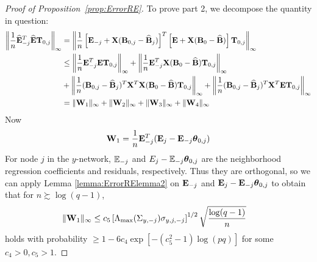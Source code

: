 \documentclass[12pt, letterpaper]{article}
\numberwithin{equation}{section}
\begin{document}
\begin{proof}[Proof of Proposition~\ref{prop:ErrorRE}]
To prove part 2, we decompose the quantity in question:
%
\begin{align}\label{eqn:ErrorRElemma2maineqn}
\left\| \frac{1}{n} \widehat {{\mathbf{E}}}_{-j}^T \widehat {{\mathbf{E}}} {\mathbf{T}}_{0,j} \right\|_\infty &=
\left\| \frac{1}{n} \left[ {\mathbf{E}}_{-j} + {\mathbf{X}} ({\mathbf{B}}_{0,j} - \widehat {{\mathbf{B}}}_j) \right]^T \left[ {\mathbf{E}} + {\mathbf{X}} ({\mathbf{B}}_0 - \widehat {{\mathbf{B}}}) \right] {\mathbf{T}}_{0,j} \right\|_\infty \notag\\
& \leq \left\| \frac{1}{n} {\mathbf{E}}_{-j}^T {\mathbf{E}} {\mathbf{T}}_{0,j} \right\|_\infty +
\left\| \frac{1}{n} {\mathbf{E}}_{-j}^T {\mathbf{X}} ({\mathbf{B}}_0 - \widehat {{\mathbf{B}}}) {\mathbf{T}}_{0,j} \right\|_\infty \notag\\
& + \left\| \frac{1}{n} ({\mathbf{B}}_{0,j} - \widehat {{\mathbf{B}}}_j)^T {\mathbf{X}}^T {\mathbf{X}} ({\mathbf{B}}_0 - \widehat {{\mathbf{B}}}) {\mathbf{T}}_{0,j} \right\|_\infty +
\left\| \frac{1}{n} ({\mathbf{B}}_{0,j} - \widehat {{\mathbf{B}}}_j)^T {\mathbf{X}}^T {\mathbf{E}} {\mathbf{T}}_{0,j} \right\|_\infty \notag\\
&= \| {\mathbf{W}}_1 \|_\infty + \| {\mathbf{W}}_2 \|_\infty + \| {\mathbf{W}}_3 \|_\infty + \| {\mathbf{W}}_4 \|_\infty
\end{align}
%
Now
%
$$
{\mathbf{W}}_1 = \frac{1}{n} {\mathbf{E}}_{-j}^T ( {\mathbf{E}}_j - {\mathbf{E}}_{-j} {\boldsymbol{\theta}}_{0,j})
$$
%
For node $j$ in the $y$-network, ${\mathbb{E}}_{-j}$ and $E_j - {\mathbb{E}}_{-j} {\boldsymbol{\theta}}_{0,j}$ are the neighborhood regression coefficients and residuals, respectively. Thus they are orthogonal, so we can apply Lemma \ref{lemma:ErrorRElemma2} on ${\mathbf{E}}_{-j}$ and ${\mathbf{E}}_j - {\mathbf{E}}_{-j} {\boldsymbol{\theta}}_{0,j}$ to obtain that for $n \succsim \log (q-1)$,
%
\begin{align}\label{eqn:ErrorRElemma2eqn5}
\| {\mathbf{W}}_1 \|_\infty & \leq c_5 \left[ \Lambda_{\max} ( \Sigma_{y,-j}) \sigma_{y,j,-j} \right]^{1/2} \sqrt{\frac{\log(q-1)}{n}}
\end{align}
%
holds with probability $\geq 1 - 6c_4 \exp [-(c_5^2-1) \log(pq)]$ for some $c_4 > 0, c_5 > 1$.
%


\end{proof}
\end{document}
